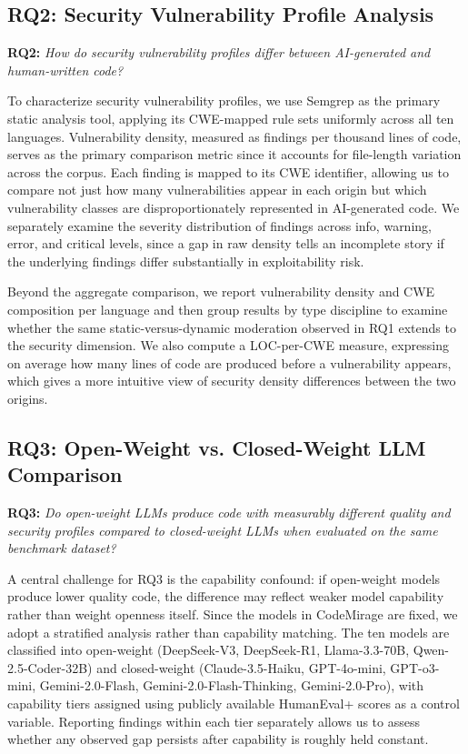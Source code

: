 \subsection{RQ2: Security Vulnerability Profile Analysis}

\noindent \textbf{RQ2:} \textit{How do security vulnerability profiles differ between AI-generated and human-written code?}

To characterize security vulnerability profiles, we use Semgrep as the primary static analysis tool, applying its CWE-mapped rule sets uniformly across all ten languages. Vulnerability density, measured as findings per thousand lines of code, serves as the primary comparison metric since it accounts for file-length variation across the corpus. Each finding is mapped to its CWE identifier, allowing us to compare not just how many vulnerabilities appear in each origin but which vulnerability classes are disproportionately represented in AI-generated code. We separately examine the severity distribution of findings across info, warning, error, and critical levels, since a gap in raw density tells an incomplete story if the underlying findings differ substantially in exploitability risk.

Beyond the aggregate comparison, we report vulnerability density and CWE composition per language and then group results by type discipline to examine whether the same static-versus-dynamic moderation observed in RQ1 extends to the security dimension. We also compute a LOC-per-CWE measure, expressing on average how many lines of code are produced before a vulnerability appears, which gives a more intuitive view of security density differences between the two origins.


\subsection{RQ3: Open-Weight vs. Closed-Weight LLM Comparison}

\noindent \textbf{RQ3:} \textit{Do open-weight LLMs produce code with measurably different quality and security profiles compared to closed-weight LLMs when evaluated on the same benchmark dataset?}

A central challenge for RQ3 is the capability confound: if open-weight models produce lower quality code, the difference may reflect weaker model capability rather than weight openness itself. Since the models in CodeMirage are fixed, we adopt a stratified analysis rather than capability matching. The ten models are classified into open-weight (DeepSeek-V3, DeepSeek-R1, Llama-3.3-70B, Qwen-2.5-Coder-32B) and closed-weight (Claude-3.5-Haiku, GPT-4o-mini, GPT-o3-mini, Gemini-2.0-Flash, Gemini-2.0-Flash-Thinking, Gemini-2.0-Pro), with capability tiers assigned using publicly available HumanEval+ scores as a control variable. Reporting findings within each tier separately allows us to assess whether any observed gap persists after capability is roughly held constant.

